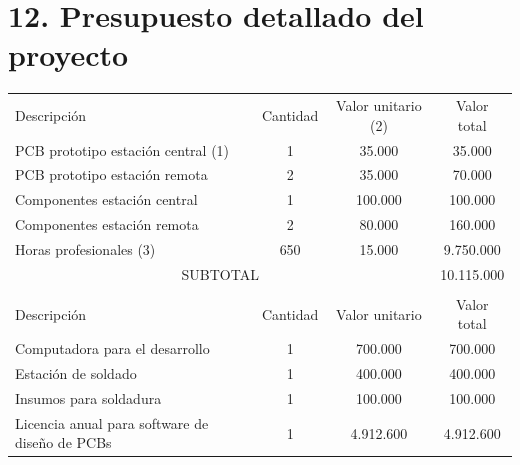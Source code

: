 \documentclass[
11pt, %
]{charter}
\begin{document}
\section{12. Presupuesto detallado del proyecto}
\label{sec:presupuesto}

\begin{table}[htpb]
\centering
\begin{tabularx}{\linewidth}{@{}|X|c|r|r|@{}}
\hline
\rowcolor[HTML]{C0C0C0} 
\multicolumn{4}{|c|}{\cellcolor[HTML]{C0C0C0}COSTOS DIRECTOS} \\ \hline
\rowcolor[HTML]{C0C0C0} 
Descripción &
	\multicolumn{1}{c|}{\cellcolor[HTML]{C0C0C0}Cantidad} &
	\multicolumn{1}{c|}{\cellcolor[HTML]{C0C0C0}Valor unitario {\footnotesize(2)}} &
	\multicolumn{1}{c|}{\cellcolor[HTML]{C0C0C0}Valor total} \\ \hline
PCB prototipo estación central {\footnotesize(1)} &
	\multicolumn{1}{c|}{1} &
	\multicolumn{1}{c|}{35.000} &
	\multicolumn{1}{c|}{35.000} \\ \hline
PCB prototipo estación remota &
	\multicolumn{1}{c|}{2} &
	\multicolumn{1}{c|}{35.000} &
	\multicolumn{1}{c|}{70.000} \\ \hline
Componentes estación central &
	\multicolumn{1}{c|}{1} &
	\multicolumn{1}{c|}{100.000} &
	\multicolumn{1}{c|}{100.000} \\ \hline
Componentes estación remota &
	\multicolumn{1}{c|}{2} &
	\multicolumn{1}{c|}{80.000} &
	\multicolumn{1}{c|}{160.000} \\ \hline
Horas profesionales {\footnotesize(3)} &
	\multicolumn{1}{c|}{650} &
	\multicolumn{1}{c|}{15.000} &
	\multicolumn{1}{c|}{9.750.000} \\ \hline

\multicolumn{3}{|c|}{SUBTOTAL} &
  \multicolumn{1}{c|}{10.115.000} \\ \hline
  
\rowcolor[HTML]{C0C0C0} 
\multicolumn{4}{|c|}{\cellcolor[HTML]{C0C0C0}COSTOS INDIRECTOS} \\ \hline
\rowcolor[HTML]{C0C0C0} 
Descripción &
	\multicolumn{1}{c|}{\cellcolor[HTML]{C0C0C0}Cantidad} &
	\multicolumn{1}{c|}{\cellcolor[HTML]{C0C0C0}Valor unitario} &
	\multicolumn{1}{c|}{\cellcolor[HTML]{C0C0C0}Valor total} \\ \hline
Computadora para el desarrollo &
	\multicolumn{1}{c|}{1} &
	\multicolumn{1}{c|}{700.000} &
	\multicolumn{1}{c|}{700.000} \\ \hline
Estación de soldado &
	\multicolumn{1}{c|}{1} &
	\multicolumn{1}{c|}{400.000} &
	\multicolumn{1}{c|}{400.000} \\ \hline
Insumos para soldadura &
	\multicolumn{1}{c|}{1} &
	\multicolumn{1}{c|}{100.000} &
	\multicolumn{1}{c|}{100.000} \\ \hline
Licencia anual para software de diseño de PCBs &
	\multicolumn{1}{c|}{1} &
	\multicolumn{1}{c|}{4.912.600} &
	\multicolumn{1}{c|}{4.912.600} \\ \hline


\end{tabularx}
\end{table}
\end{document}
